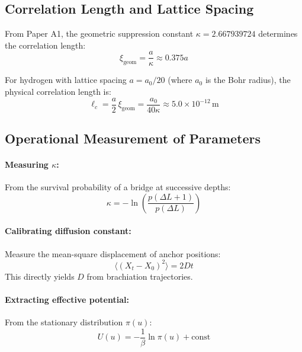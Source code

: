 \documentclass[11pt]{article}
\theoremstyle{plain}
\theoremstyle{definition}
\begin{document}
\subsection{Correlation Length and Lattice Spacing}

From Paper A1, the geometric suppression constant $\kappa = 2.667939724$ determines the correlation length:
\begin{equation}
  \xi_{\mathrm{geom}} = \frac{a}{\kappa} \approx 0.375a
\end{equation}

For hydrogen with lattice spacing $a = a_0/20$ (where $a_0$ is the Bohr radius), the physical correlation length is:
\begin{equation}
  \ell_c = \frac{a}{2}\,\xi_{\mathrm{geom}} = \frac{a_0}{40\kappa} \approx 5.0 \times 10^{-12}\,\text{m}
\end{equation}

\subsection{Operational Measurement of Parameters}

\paragraph{Measuring $\kappa$:}
From the survival probability of a bridge at successive depths:
\begin{equation}
  \kappa = -\ln\left(\frac{p(\Delta L+1)}{p(\Delta L)}\right)
\end{equation}

\paragraph{Calibrating diffusion constant:}
Measure the mean-square displacement of anchor positions:
\begin{equation}
  \langle (X_t - X_0)^2 \rangle = 2Dt
\end{equation}
This directly yields $D$ from brachiation trajectories.

\paragraph{Extracting effective potential:}
From the stationary distribution $\pi(u)$:
\begin{equation}
  U(u) = -\frac{1}{\beta}\ln\pi(u) + \text{const}
\end{equation}
\end{document}
